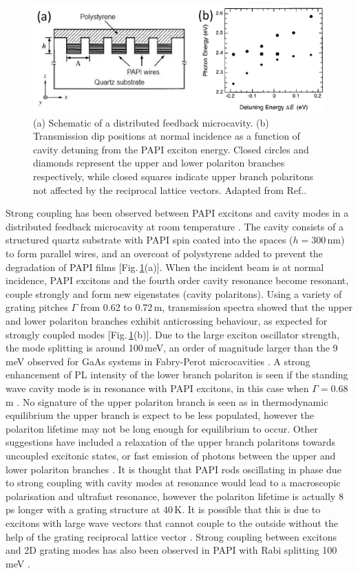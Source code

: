 \begin{figure}[h!]
\centering
\includegraphics[width=\textwidth]{Fig20}
\caption{(a) Schematic of a distributed feedback microcavity. (b) Transmission dip positions at normal incidence as a function of cavity detuning from the PAPI exciton energy. Closed circles and diamonds represent the upper and lower polariton branches respectively, while closed squares indicate upper branch polaritons not affected by the reciprocal lattice vectors. Adapted from Ref.\!.}
\label{2Fig20}
\end{figure}
Strong coupling has been observed between PAPI excitons and cavity modes in a distributed feedback microcavity at room temperature \cite{Fujita1998, Fujita1999, Fujita2000}. The cavity consists of a structured quartz substrate with PAPI spin coated into the spaces ($h=300$\,nm) to form parallel wires, and an overcoat of polystyrene added to prevent the degradation of PAPI films [Fig.\,\ref{2Fig20}(a)]. When the incident beam is at normal incidence, PAPI excitons and the fourth order cavity resonance become resonant, couple strongly and form new eigenstates (cavity polaritons). Using a variety of grating pitches $\Gamma$ from 0.62 to 0.72\,\textmu m, transmission spectra showed that the upper and lower polariton branches exhibit anticrossing behaviour, as expected for strongly coupled modes [Fig.\,\ref{2Fig20}(b)]. Due to the large exciton oscillator strength, the mode splitting is around 100\,meV, an order of magnitude larger than the 9\,meV observed for GaAs systems in Fabry-Perot microcavities \cite{Fujita1998}. A strong enhancement of PL intensity of the lower branch polariton is seen if the standing wave cavity mode is in resonance with PAPI excitons, in this case when $\Gamma=0.68\,$\textmu m \cite{Fujita1999}. No signature of the upper polariton branch is seen as in thermodynamic equilibrium the upper branch is expect to be less populated, however the polariton lifetime may not be long enough for equilibrium to occur. Other suggestions have included a relaxation of the upper branch polaritons towards uncoupled excitonic states, or fast emission of photons between the upper and lower polariton branches \cite{Lanty2008}. It is thought that PAPI rods oscillating in phase due to strong coupling with cavity modes at resonance would lead to a macroscopic polarisation and ultrafast resonance, however the polariton lifetime is actually 8\,ps longer with a grating structure at 40\,K. It is possible that this is due to excitons with large wave vectors that cannot couple to the outside without the help of the grating reciprocal lattice vector \cite{Fujita2000}. Strong coupling between excitons and 2D grating modes has also been observed in PAPI with Rabi splitting 100\,meV \cite{Ishi-Hayase2003}.

